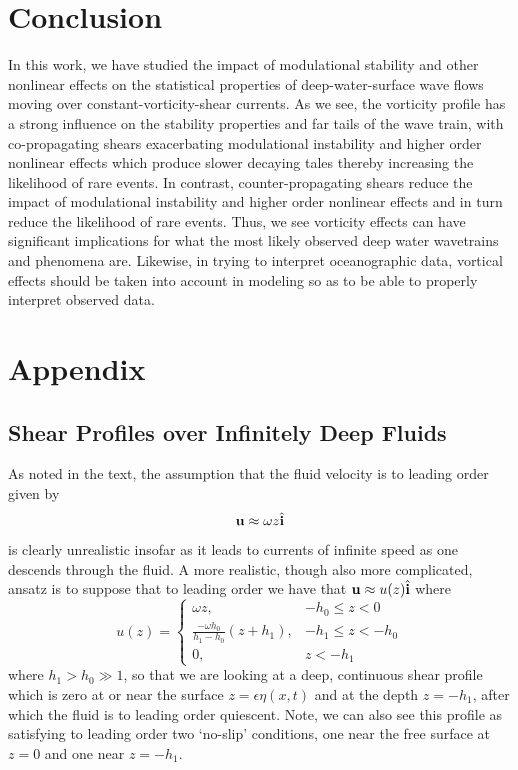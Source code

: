 \documentclass[a4paper,11pt]{article}
\newcommand{\ba}{\begin{array}}
\newcommand{\ea}{\end{array}}
\begin{document}
\section{Conclusion}

In this work, we have studied the impact of modulational stability and other nonlinear effects on the statistical properties of deep-water-surface wave flows moving over constant-vorticity-shear currents.  As we see, the vorticity profile has a strong influence on the stability properties and far tails of the wave train, with co-propagating shears exacerbating modulational instability and higher order nonlinear effects which produce slower decaying tales thereby increasing the likelihood of rare events.  In contrast, counter-propagating shears reduce the impact of modulational instability and higher order nonlinear effects and in turn reduce the likelihood of rare events.  Thus, we see vorticity effects can have significant implications for what the most likely observed deep water wavetrains and phenomena are.  Likewise, in trying to interpret oceanographic data, vortical effects should be taken into account in modeling so as to be able to properly interpret observed data.    

\section*{Appendix}
\subsection*{Shear Profiles over Infinitely Deep Fluids}
As noted in the text, the assumption that the fluid velocity is to leading order given by 
\[
{\bf u} \approx \omega z \hat{{\bf i}}
\]
is clearly unrealistic insofar as it leads to currents of infinite speed as one descends through the fluid.  A more realistic, though also more complicated, ansatz is to suppose that to leading order we have that ${\bf u}\approx u(z)\hat{{\bf i}}$ where  
\[
u(z) = \left\{\ba{rl} \omega z, & -h_{0} \leq z < 0 \\
\frac{-\omega h_{0}}{h_{1}-h_{0}} (z+h_{1}), & -h_{1} \leq z < -h_{0} \\
0, & z < -h_{1}
\ea \right.
\] 
where $h_{1}>h_{0}\gg 1$, so that we are looking at a deep, continuous shear profile which is zero at or near the surface $z=\epsilon \eta(x,t)$ and at the depth $z=-h_{1}$, after which the fluid is to leading order quiescent.  Note, we can also see this profile as satisfying to leading order two `no-slip' conditions, one near the free surface at $z=0$ and one near $z=-h_{1}$.
\end{document}
